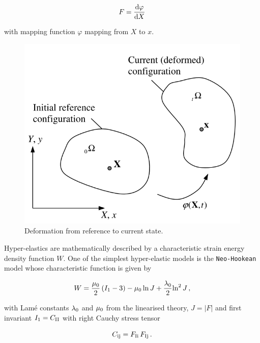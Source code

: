 \documentclass[format=acmtog,12pt,screen=true,review=false,natbib=false,]{acmart}
\begin{document}
\begin{equation}
    \label{eq:defgrad}
    F = \frac{{\rm{d}}\varphi}{{\rm{d}}X}
\end{equation}

with mapping function $\varphi$ mapping from $X$ to $x$.

\begin{figure}[!htbp]
    \centering
    \includegraphics[width=\columnwidth]{Deformation}
    \caption{Deformation from reference to current state. \cite{Gu07}}
    \label{fig:deformation}
\end{figure}

Hyper-elastics are mathematically described by a characteristic strain energy density function $W$. One of the simplest hyper-elastic models is the \texttt{Neo-Hookean} model \cite{Gha15} whose characteristic function is given by

\begin{equation}
    \label{eq:NeoHooke}
    W=\frac{\mu_{\rm{0}}}{2}\left(I_{\rm{1}}-3\right)-\mu_{\rm{0}}\,{\rm{ln}}\,J+\frac{\lambda_{\rm{0}}}{2}{\rm{ln}}^2\,J\,,
\end{equation}

with Lam\'{e} constants $\lambda_{\rm{0}}$ and $\mu_{\rm{0}}$ from the linearised theory, $J=\lvert F\rvert$ and first invariant $I_{\rm 1}=C_{\rm{II}}$ with right Cauchy stress tensor \cite{Gha15}

\begin{equation}
    C_{\rm{ij}}=F_{\rm{Ii}}\,F_{\rm{Ij}}\,.
\end{equation}
\end{document}
